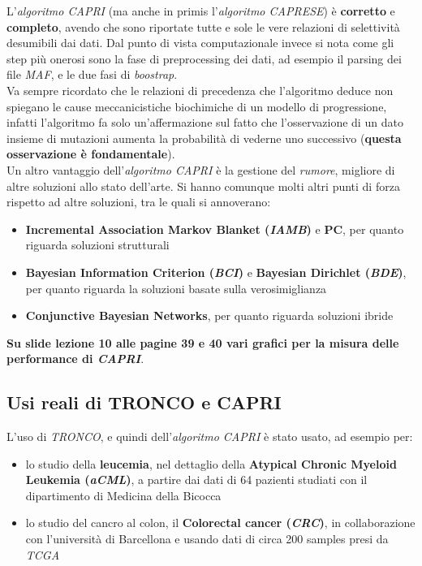 \documentclass[a4paper,12pt, oneside]{book}
\begin{document}
L'\textit{algoritmo CAPRI} (ma anche in primis l'\textit{algoritmo CAPRESE})
è \textbf{corretto} e \textbf{completo}, avendo che sono riportate tutte e sole
le vere relazioni di selettività desumibili dai dati. Dal punto di vista
computazionale invece si nota come gli step più onerosi sono la fase di
preprocessing dei dati, ad esempio il parsing dei file \textit{MAF}, e le due
fasi di \textit{boostrap}.\\
Va sempre ricordato che le relazioni di precedenza che l'algoritmo
deduce non spiegano le cause meccanicistiche biochimiche di un modello di
progressione, infatti l'algoritmo fa solo un'affermazione sul fatto che
l'osservazione di un dato insieme di mutazioni aumenta la probabilità di vederne
uno successivo (\textbf{questa osservazione è fondamentale}).\\
Un altro vantaggio dell'\textit{algoritmo CAPRI} è la gestione del
\textit{rumore}, migliore di altre soluzioni allo stato dell'arte. Si hanno
comunque molti altri punti di forza rispetto ad altre soluzioni, tra le quali si
annoverano:
\begin{itemize}
  \item \textbf{Incremental Association Markov Blanket (\textit{IAMB})} e
  \textbf{PC}, per quanto riguarda soluzioni strutturali
  \item \textbf{Bayesian Information Criterion (\textit{BCI})} e
  \textbf{Bayesian Dirichlet (\textit{BDE})}, per quanto riguarda la
  soluzioni basate sulla verosimiglianza  
  \item \textbf{Conjunctive Bayesian Networks}, per quanto riguarda soluzioni
  ibride 
\end{itemize}
\textbf{Su slide lezione 10 alle pagine 39 e 40 vari grafici per la misura delle
  performance di \textit{CAPRI}}.
\subsection{Usi reali di TRONCO e CAPRI}
L'uso di \textit{TRONCO}, e quindi dell'\textit{algoritmo CAPRI} è stato usato,
ad esempio per:
\begin{itemize}
  \item lo studio della \textbf{leucemia}, nel dettaglio della \textbf{Atypical
    Chronic Myeloid Leukemia (\textit{aCML})}, a partire dai dati di 64 pazienti
  studiati con il dipartimento di Medicina della Bicocca
  \item lo studio del cancro al colon, il \textbf{Colorectal cancer
    (\textit{CRC})}, in collaborazione con l'università di Barcellona e usando
  dati di circa 200 samples presi da \textit{TCGA}
\end{itemize}
\end{document}
